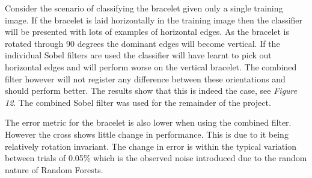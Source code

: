 \documentclass[12pt]{IIBproject}
\begin{document}
Consider the scenario of classifying the bracelet given only a single training image. If the bracelet is laid horizontally in the training image then the classifier will be presented with lots of examples of horizontal edges. As the bracelet is rotated through 90 degrees the dominant edges will become vertical. If the individual Sobel filters are used the classifier will have learnt to pick out horizontal edges and will perform worse on the vertical bracelet. The combined filter however will not register any difference between these orientations and should perform better. The results show that this is indeed the case, see \emph{Figure 12}. The combined Sobel filter was used for the remainder of the project.

 The error metric for the bracelet is also lower when using the combined filter. However the cross shows little change in performance. This is due to it being relatively rotation invariant. The change in error is within the typical variation between trials of 0.05\% which is the observed noise introduced due to the random nature of Random Forests.
\end{document}
